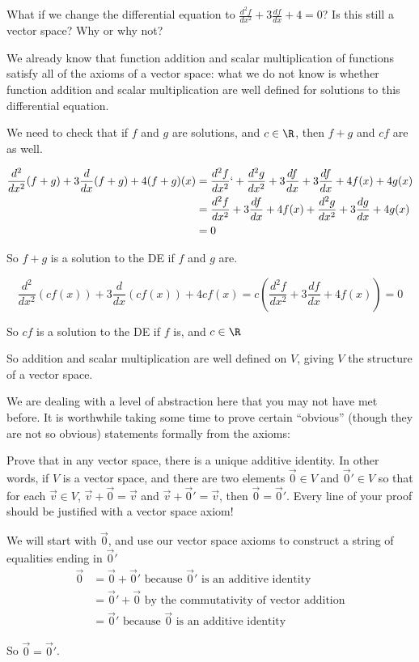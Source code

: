 \documentclass{ximera}
\begin{document}
What if we change the differential equation to $\frac{d^2f}{dx^2} + 3\frac{df}{dx} +4 = 0$?  Is this still a vector space?  Why or why not?
\begin{free-response}
  We already know that function addition and scalar multiplication of functions satisfy all of the axioms of a vector space:  what we do not know is whether
  function addition and scalar multiplication are well defined for solutions to this differential equation.  
			
  We need to check that if $f$ and $g$ are solutions, and $c\in \R$, then $f+g$ and $cf$ are as well.
			
  \begin{align*}
    \frac{d^2}{dx^2}(f+g) + 3\frac{d}{dx}(f+g)+4(f+g)(x) &=  \frac{d^2f}{dx^2} `+ \frac{d^2g}{dx^2} + 3\frac{df}{dx} + 3\frac{df}{dx} +4f(x)+4g(x)\\
    &= \frac{d^2f}{dx^2} + 3\frac{df}{dx} +4f(x) + \frac{d^2g}{dx^2} + 3\frac{dg}{dx} +4g(x) \\
    &= 0
  \end{align*}
  
  So $f+g$ is a solution to the DE if $f$ and $g$ are.
  
  \[ \frac{d^2}{dx^2} (cf(x))+ 3\frac{d}{dx} (cf(x)) +4cf(x) = c(\frac{d^2f}{dx^2} + 3\frac{df}{dx} +4f(x)) = 0\]
  
  So $cf$ is a solution to the DE if $f$ is, and $c\in \R$
  
  So  addition and scalar multiplication are well defined on $V$, giving $V$ the structure of a vector space.
\end{free-response}

We are dealing with a level of abstraction here that you may not have
met before.  It is worthwhile taking some time to prove certain
``obvious'' (though they are not so obvious) statements
formally from the axioms:
	
Prove that in any vector space, there is a unique additive identity.  In other words, if $V$ is a vector space, and there are two elements $\vec{0} \in V$ and $\vec{0}' \in V$ so that for each 
$\vec{v} \in V$, $\vec{v}+\vec{0}=\vec{v}$ and $\vec{v} + \vec{0}' = \vec{v}$, then $\vec{0}=\vec{0}'$.  Every line of your proof should be justified with a vector space axiom!
		
\begin{free-response}
  We will start with $\vec{0}$, and use our vector space axioms to construct a string of equalities ending in $\vec{0}'$
  \begin{align*}
    \vec{0} &= \vec{0}+\vec{0}' \text{ because $\vec{0}'$ is an additive identity}\\
    &= \vec{0}'+\vec{0} \text{ by the commutativity of vector addition}\\
    &=\vec{0}'\text{ because $\vec{0}$ is an additive identity}
  \end{align*}
  
  So $\vec{0} = \vec{0}'$.
\end{free-response}	
		
\end{document}
